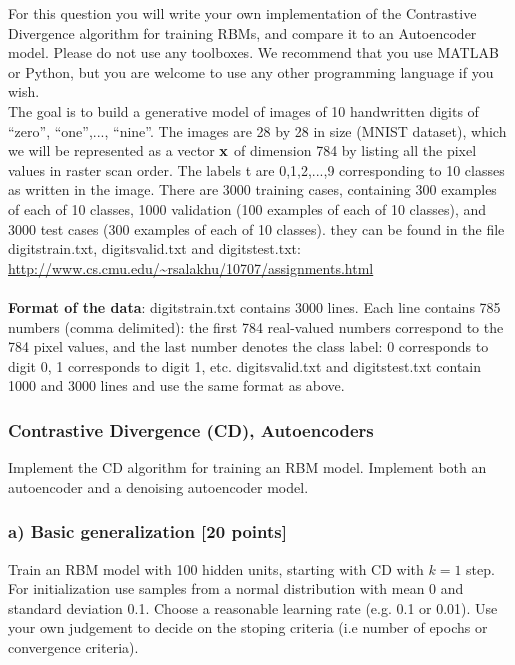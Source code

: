 \documentclass[10pt]{article}
\newcommand{\bx}{{\bf{x}}}
\begin{document}
For this question you will 
write your own implementation of the Contrastive Divergence algorithm 
for training RBMs, and compare it to an Autoencoder model. 
Please do not use any toolboxes. 
We recommend that you use MATLAB or Python, but you are welcome
to use any other programming language if you wish. 
\\
 
The goal is to build a generative model of images of
10 handwritten digits of ``zero'', ``one'',..., ``nine''.
The images are 28 by 28 in size (MNIST dataset), which we will be represented
as a vector $\bx$ of dimension 784 by listing all the pixel values in
raster scan order. The labels t are 0,1,2,...,9 corresponding to
10 classes as written in the image.
There are 3000 training cases, containing 300 examples of each of 10
classes,
1000 validation (100 examples of each of 10 classes), and 3000
test cases (300 examples of each of 10 classes).
they can be found in the file digitstrain.txt, digitsvalid.txt
 and digitstest.txt: \\

\url{http://www.cs.cmu.edu/~rsalakhu/10707/assignments.html}
\\
\\

{\bf Format of the data}: digitstrain.txt contains 3000 lines.
Each line contains 785 numbers (comma delimited):
the first 784 real-valued numbers
correspond to the
784 pixel values, and the last number denotes
the class label: 0 corresponds to digit 0, 1 corresponds to digit 1, etc.
digitsvalid.txt and digitstest.txt contain 1000 and 3000 lines
and use the same format as above.


\subsubsection*{Contrastive Divergence (CD), Autoencoders}
Implement the CD algorithm for training an RBM model.
Implement both an autoencoder and a denoising autoencoder model. 


\subsubsection*{a) Basic generalization [20 points]}
Train an RBM model with 100 hidden units, starting with CD with $k = 1$ step. For initialization use samples from a normal distribution with mean 0 and standard deviation 0.1. Choose a reasonable 
learning rate (e.g. 0.1 or 0.01). Use your own judgement to decide on the stoping criteria (i.e number of epochs or convergence criteria). 
\\
\end{document}
